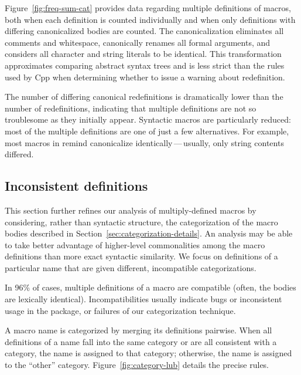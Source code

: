 \documentclass[10pt]{article}
\newcommand{\pkg}[1]{\textsf{#1}}
\begin{document}

Figure~\ref{fig:freq-sum-cat} provides data regarding multiple definitions
of macros, both when each definition is counted individually and when only
definitions with differing canonicalized bodies are counted.  The
canonicalization eliminates all comments and whitespace, canonically
renames all formal arguments, and considers all character and string
literals to be identical.  This transformation approximates comparing
abstract syntax trees and is less strict than the rules used by Cpp when
determining whether to issue a warning about redefinition.

The number of differing canonical redefinitions is dramatically lower than
the number of redefinitions, indicating that multiple definitions are not
so troublesome as they initially appear.  Syntactic macros are particularly
reduced: most of the multiple definitions are one of just a few
alternatives.  For example, most macros in \pkg{remind} canonicalize
identically\,---\,usually, only string contents differed.


\subsection{Inconsistent definitions}
\label{sec:inconsistent}

This section further refines our analysis of multiply-defined macros by
considering, rather than syntactic structure, the categorization of the
macro bodies described in Section~\ref{sec:categorization-details}.  An
analysis may be able to take better advantage of higher-level commonalities
among the macro definitions than more exact syntactic similarity.  We focus
on definitions of a particular name that are given different, incompatible
categorizations.



In 96\% of cases, multiple definitions of a macro are compatible (often,
the bodies are lexically identical).  Incompatibilities usually indicate
bugs or inconsistent usage in the package, or failures of our
categorization technique.

A macro name is categorized by merging its definitions pairwise.  When all
definitions of a name fall into the same category or are all consistent
with a category, the name is assigned to that category; otherwise, the name
is assigned to the ``other'' category.  Figure~\ref{fig:category-lub}
details the precise rules.
\end{document}
